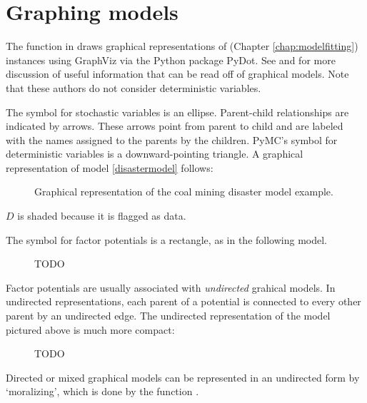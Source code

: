 \section{Graphing models} \label{graphical}


The function  in  draws graphical representations of  (Chapter \ref{chap:modelfitting}) instances using GraphViz via the Python package PyDot. See \cite{dawidmarkov} and \cite{Jordan:2004p5439} for more discussion of useful information that can be read off of graphical models. Note that these authors do not consider deterministic variables.

The symbol for stochastic variables is an ellipse. Parent-child relationships are indicated by arrows. These arrows point from parent to child and are labeled with the names assigned to the parents by the children. PyMC's symbol for deterministic variables is a downward-pointing triangle. A graphical representation of model \ref{disastermodel} follows:
\begin{figure}[h!]
\begin{center}
    \caption{Graphical representation of the coal mining disaster model example.}
\end{center}
\end{figure}
$D$ is shaded because it is flagged as data.


The symbol for factor potentials is a rectangle, as in the following model.
\begin{figure}[h!]
\begin{center}
    \caption{TODO}
\end{center}
\end{figure}
Factor potentials are usually associated with \emph{undirected} grahical models. In undirected representations, each parent of a potential is connected to every other parent by an undirected edge. The undirected representation of the model pictured above is much more compact:
\begin{figure}[h!]
\begin{center}
    \caption{TODO}
\end{center}
\end{figure}
Directed or mixed graphical models can be represented in an undirected form by `moralizing', which is done by the function .


